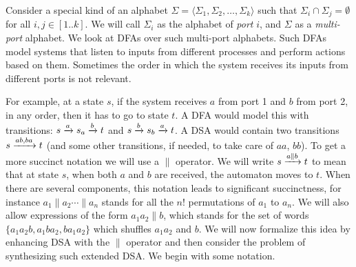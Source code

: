 \label{sec:multi-port-inputs}%


Consider a special kind of an alphabet
$\Sigma = \langle \Sigma_1, \Sigma_2, \dots, \Sigma_k \rangle$ such
that $\Sigma_i \cap \Sigma_j = \emptyset$ for all $i, j \in
[1..k]$. We will call $\Sigma_i$ as the alphabet of \emph{port} $i$,
and $\Sigma$ as a \emph{multi-port} alphabet. We
look at DFAs over such multi-port alphabets. Such DFAs model systems
that listen to inputs from different processes and perform actions
based on them. Sometimes the order in which the system receives its
inputs from different ports is not relevant.%
  
For example, at a state
$s$, if the system receives $a$ from port 1 and $b$ from port 2, in any
order, then it has to go to state $t$.  A DFA would model this with
transitions: $s \xrightarrow{a} s_a \xrightarrow{b} t$ and $s \xrightarrow{b} s_b \xrightarrow{a}
t$. A DSA would contain two transitions $s \xrightarrow{ab, ba} t$ (and some
other transitions, if needed, to take care of $aa$, $bb$). To get a
more succinct notation we will use a $\parallel$ operator. We will
write $s \xrightarrow{a \parallel b} t$ to mean that at state $s$, when
both $a$ and $b$ are received, the automaton moves to $t$. When there
are several components, this notation leads to significant
succinctness, for instance $a_1 \parallel a_2 \cdots \parallel a_n$
stands for all the $n!$ permutations of $a_1$ to $a_n$. We will also
allow expressions of the form $a_1 a_2 \parallel b$, which stands for
the set of words $\{a_1 a_2 b, a_1 b a_2, b a_1 a_2\}$ which shuffles
$a_1a_2$ and $b$. We will now formalize this idea by enhancing DSA with
the $\parallel$ operator and then consider the problem of synthesizing
such extended DSA. We begin with some notation.%




